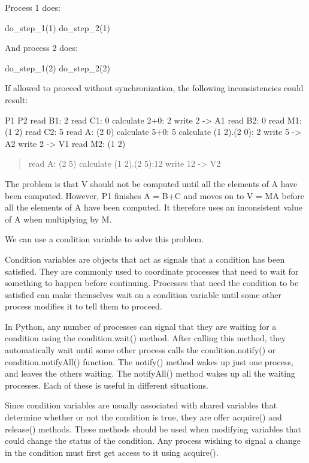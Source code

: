 \documentclass[letterpaper,10pt,dvipdfmx]{sphinxmanual}
\begin{document}
Process 1 does:

do\_step\_1(1)
do\_step\_2(1)

And process 2 does:

do\_step\_1(2)
do\_step\_2(2)

If allowed to proceed without synchronization, the following inconsistencies could result:

P1                          P2
read B1: 2
read C1: 0
calculate 2+0: 2
write 2 -\textgreater{} A1               read B2: 0
read M1: (1 2)              read C2: 5
read A: (2 0)               calculate 5+0: 5
calculate (1 2).(2 0): 2    write 5 -\textgreater{} A2
write 2 -\textgreater{} V1               read M2: (1 2)
\begin{quote}

read A: (2 5)
calculate (1 2).(2 5):12
write 12 -\textgreater{} V2
\end{quote}

The problem is that V should not be computed until all the elements of A have been computed. However, P1 finishes A = B+C and moves on to V = MA before all the elements of A have been computed. It therefore uses an inconsistent value of A when multiplying by M.

We can use a condition variable to solve this problem.

Condition variables are objects that act as signals that a condition has been satisfied. They are commonly used to coordinate processes that need to wait for something to happen before continuing. Processes that need the condition to be satisfied can make themselves wait on a condition variable until some other process modifies it to tell them to proceed.

In Python, any number of processes can signal that they are waiting for a condition using the condition.wait() method. After calling this method, they automatically wait until some other process calls the condition.notify() or condition.notifyAll() function. The notify() method wakes up just one process, and leaves the others waiting. The notifyAll() method wakes up all the waiting processes. Each of these is useful in different situations.

Since condition variables are usually associated with shared variables that determine whether or not the condition is true, they are offer acquire() and release() methods. These methods should be used when modifying variables that could change the status of the condition. Any process wishing to signal a change in the condition must first get access to it using acquire().
\end{document}
